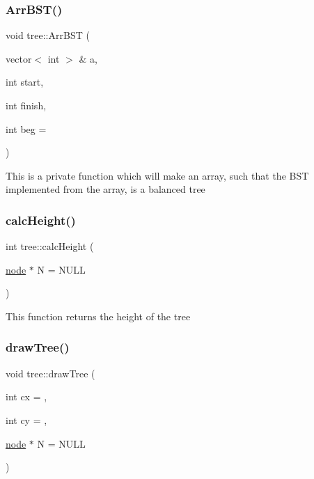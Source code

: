 \subsubsection{\texorpdfstring{Arr\+B\+S\+T()}{ArrBST()}}
{\footnotesize\ttfamily void tree\+::\+Arr\+B\+ST (\begin{DoxyParamCaption}\item[{vector$<$ int $>$ \&}]{a,  }\item[{int}]{start,  }\item[{int}]{finish,  }\item[{int}]{beg = {} }\end{DoxyParamCaption})\hspace{0.3cm}{\ttfamily [private]}}

This is a private function which will make an array, such that the B\+ST implemented from the array, is a balanced tree \mbox{\label{classtree_a796f88cacd055670fb3a9f7ce3cb38f2}} 
\subsubsection{\texorpdfstring{calc\+Height()}{calcHeight()}}
{\footnotesize\ttfamily int tree\+::calc\+Height (\begin{DoxyParamCaption}\item[{\mbox{\hyperlink{structnode}{node}} $\ast$}]{N = {\ttfamily NULL} }\end{DoxyParamCaption})\hspace{0.3cm}{\ttfamily [private]}}

This function returns the height of the tree \mbox{\label{classtree_a09613a8cf3f28dfa51dfd06ceeb90fa0}} 
\subsubsection{\texorpdfstring{draw\+Tree()}{drawTree()}}
{\footnotesize\ttfamily void tree\+::draw\+Tree (\begin{DoxyParamCaption}\item[{int}]{cx = {},  }\item[{int}]{cy = {},  }\item[{\mbox{\hyperlink{structnode}{node}} $\ast$}]{N = {\ttfamily NULL} }\end{DoxyParamCaption})\hspace{0.3cm}{\ttfamily [private]}}

